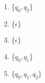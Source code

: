 \documentclass[12pt]{article}
\begin{document}
\begin{enumerate}
	\begin{enumerate}
	\item \{$q_0,q_2$\}
	\item \{$\epsilon$\}
	\item \{$\epsilon$\}
	\item \{$q_0,q_1$\}
	\item \{$q_0,q_1,q_2$\}
	\end{enumerate}
	

\end{enumerate}
\end{document}
